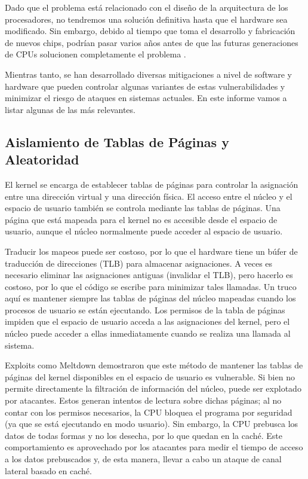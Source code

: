 \documentclass[lettersize,compsoc]{IEEEtran}
\begin{document}
Dado que el problema está relacionado con el diseño de la arquitectura de los procesadores, no tendremos una solución definitiva hasta que el hardware sea modificado. Sin embargo, debido al tiempo que toma el desarrollo y fabricación de nuevos chips, podrían pasar varios años antes de que las futuras generaciones de CPUs solucionen completamente el problema \cite{spectre} \cite{meltdown}.

Mientras tanto, se han desarrollado diversas mitigaciones a nivel de software y hardware que pueden controlar algunas variantes de estas vulnerabilidades y minimizar el riesgo de ataques en sistemas actuales. En este informe vamos a listar algunas de las más relevantes.

\subsection{Aislamiento de Tablas de Páginas y Aleatoridad} El kernel se encarga de establecer tablas de páginas para controlar la asignación entre una dirección virtual y una dirección física. El acceso entre el núcleo y el espacio de usuario también se controla mediante las tablas de páginas. Una página que está mapeada para el kernel no es accesible desde el espacio de usuario, aunque el núcleo normalmente puede acceder al espacio de usuario.

Traducir los mapeos puede ser costoso, por lo que el hardware tiene un búfer de traducción de direcciones\cite{TLB} (TLB) para almacenar asignaciones. A veces es necesario eliminar las asignaciones antiguas (invalidar el TLB), pero hacerlo es costoso, por lo que el código se escribe para minimizar tales llamadas. Un truco aquí es mantener siempre las tablas de páginas del núcleo mapeadas cuando los procesos de usuario se están ejecutando. Los permisos de la tabla de páginas impiden que el espacio de usuario acceda a las asignaciones del kernel, pero el núcleo puede acceder a ellas inmediatamente cuando se realiza una llamada al sistema.

Exploits como Meltdown demostraron que este método de mantener las tablas de páginas del kernel disponibles en el espacio de usuario es vulnerable. Si bien no permite directamente la filtración de información del núcleo, puede ser explotado por atacantes. Estos generan intentos de lectura sobre dichas páginas; al no contar con los permisos necesarios, la CPU bloquea el programa por seguridad (ya que se está ejecutando en modo usuario). Sin embargo, la CPU prebusca los datos de todas formas y no los desecha, por lo que quedan en la caché. Este comportamiento es aprovechado por los atacantes para medir el tiempo de acceso a los datos prebuscados y, de esta manera, llevar a cabo un ataque de canal lateral basado en caché.
\end{document}

